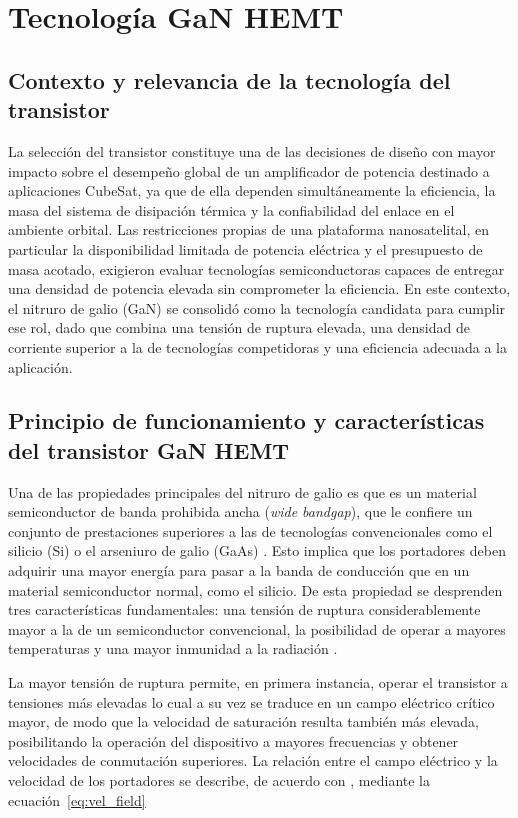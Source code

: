 \chapter[Tecnología GaN HEMT]{Tecnología GaN HEMT} \label{sec:gan_hemt}
\section{Contexto y relevancia de la tecnología del transistor}
La selección del transistor constituye una de las decisiones de diseño con mayor impacto sobre el desempeño global de un amplificador de potencia destinado a aplicaciones CubeSat, ya que de ella dependen simultáneamente la eficiencia, la masa del sistema de disipación térmica y la confiabilidad del enlace en el ambiente orbital. Las restricciones propias de una plataforma nanosatelital, en particular la disponibilidad limitada de potencia eléctrica y el presupuesto de masa acotado, exigieron evaluar tecnologías semiconductoras capaces de entregar una densidad de potencia elevada sin comprometer la eficiencia. En este contexto, el nitruro de galio (GaN) se consolidó como la tecnología candidata para cumplir ese rol, dado que combina una tensión de ruptura elevada, una densidad de corriente superior a la de tecnologías competidoras y una eficiencia adecuada a la aplicación.

\section{Principio de funcionamiento y características del transistor GaN HEMT}
Una de las propiedades principales del nitruro de galio es que es un material semiconductor de banda prohibida ancha (\textit{wide bandgap}), que le confiere un conjunto de prestaciones superiores a las de tecnologías convencionales como el silicio (Si) o el arseniuro de galio (GaAs) \cite{boomer2020, mishra2008, deblecker2015}. Esto implica que los portadores deben adquirir una mayor energía para pasar a la banda de conducción que en un material semiconductor normal, como el silicio. De esta propiedad se desprenden tres características fundamentales: una tensión de ruptura considerablemente mayor a la de un semiconductor convencional, la posibilidad de operar a mayores temperaturas y una mayor inmunidad a la radiación \cite{mishra2008, deblecker2015}.

La mayor tensión de ruptura permite, en primera instancia, operar el transistor a tensiones más elevadas lo cual a su vez se traduce en un campo eléctrico crítico mayor, de modo que la velocidad de saturación resulta también más elevada, posibilitando la operación del dispositivo a mayores frecuencias y obtener velocidades de conmutación superiores. La relación entre el campo eléctrico y la velocidad de los portadores se describe, de acuerdo con \cite{taur2021}, mediante la ecuación~\eqref{eq:vel_field}

